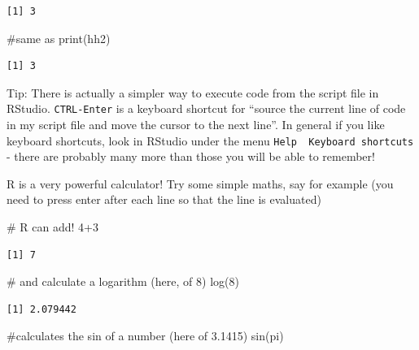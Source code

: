 \documentclass[
  letterpaper,
  DIV=11,
  numbers=noendperiod]{scrartcl}
\newenvironment{Shaded}{\begin{snugshade}}{\end{snugshade}}
\newcommand{\CommentTok}[1]{\textcolor[rgb]{0.37,0.37,0.37}{#1}}
\newcommand{\DecValTok}[1]{\textcolor[rgb]{0.68,0.00,0.00}{#1}}
\newcommand{\FunctionTok}[1]{\textcolor[rgb]{0.28,0.35,0.67}{#1}}
\newcommand{\NormalTok}[1]{\textcolor[rgb]{0.00,0.23,0.31}{#1}}
\newcommand{\SpecialCharTok}[1]{\textcolor[rgb]{0.37,0.37,0.37}{#1}}
\begin{document}
\begin{verbatim}
[1] 3
\end{verbatim}

\begin{Shaded}
\begin{Highlighting}[]
\CommentTok{\#same as }
\FunctionTok{print}\NormalTok{(hh2)}
\end{Highlighting}
\end{Shaded}

\begin{verbatim}
[1] 3
\end{verbatim}

Tip: There is actually a simpler way to execute code from the script
file in RStudio. \texttt{CTRL-Enter} is a keyboard shortcut for ``source
the current line of code in my script file and move the cursor to the
next line''. In general if you like keyboard shortcuts, look in RStudio
under the menu \texttt{Help\ \textbar{}\ Keyboard\ shortcuts} - there
are probably many more than those you will be able to remember!

R is a very powerful calculator! Try some simple maths, say for example
(you need to press enter after each line so that the line is evaluated)

\begin{Shaded}
\begin{Highlighting}[]
\CommentTok{\# R can add!}
\DecValTok{4}\SpecialCharTok{+}\DecValTok{3}
\end{Highlighting}
\end{Shaded}

\begin{verbatim}
[1] 7
\end{verbatim}

\begin{Shaded}
\begin{Highlighting}[]
\CommentTok{\# and calculate a logarithm (here, of 8)}
\FunctionTok{log}\NormalTok{(}\DecValTok{8}\NormalTok{)}
\end{Highlighting}
\end{Shaded}

\begin{verbatim}
[1] 2.079442
\end{verbatim}

\begin{Shaded}
\begin{Highlighting}[]
\CommentTok{\#calculates the sin of a number (here of 3.1415)}
\FunctionTok{sin}\NormalTok{(pi)}
\end{Highlighting}
\end{Shaded}
\end{document}
